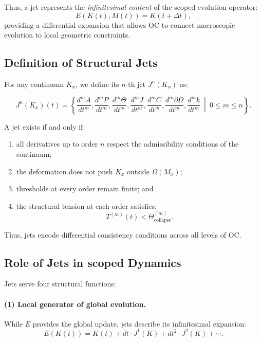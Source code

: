 Thus, a jet represents the \emph{infinitesimal content} of the scoped
evolution operator:
\[
E(K(t), M(t)) = K(t+\Delta t),
\]
providing a differential expansion that allows OC to connect macroscopic
evolution to local geometric constraints.



\subsection{Definition of Structural Jets}

For any continuum $K_x$, we define its $n$-th jet $J^n(K_x)$ as:

\begin{equation}
J^n(K_x)(t) = 
\left\{
\frac{d^m A}{dt^m},
\frac{d^m P}{dt^m},
\frac{d^m \Theta}{dt^m},
\frac{d^m J}{dt^m},
\frac{d^m C}{dt^m},
\frac{d^m \partial\Omega}{dt^m},
\frac{d^m k}{dt^m}
\ \middle|\ 
0 \le m \le n
\right\}.
\end{equation}

A jet exists if and only if:

\begin{enumerate}
    \item all derivatives up to order $n$ respect the admissibility
    conditions of the continuum;
    \item the deformation does not push $K_x$ outside $\Omega(M_x)$;
    \item thresholds at every order remain finite; and
    \item the structural tension at each order satisfies:
    \[
        T^{(m)}(t) < \Theta_{\mathrm{collapse}}^{(m)}.
    \]
\end{enumerate}

Thus, jets encode differential consistency conditions across all levels
of OC.



\subsection{Role of Jets in scoped Dynamics}

Jets serve four structural functions:

\paragraph{(1) Local generator of global evolution.}
While $E$ provides the global update, jets describe its infinitesimal
expansion:
\[
E(K(t)) = K(t) + dt \cdot J^1(K) + dt^2 \cdot J^2(K) + \cdots.
\]

